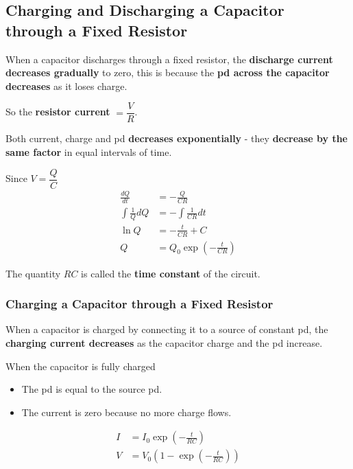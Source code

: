 \subsection{Charging and Discharging a Capacitor\\through a Fixed Resistor}

When a capacitor discharges through a fixed resistor, the \textbf{discharge current decreases gradually} to zero, this is because the \textbf{pd across the capacitor decreases} as it loses charge.

So the \textbf{resistor current} $=\dfrac{V}{R}$.

Both current, charge and pd \textbf{decreases exponentially} - they \textbf{decrease by the same factor} in equal intervals of time.

Since $V=\dfrac{Q}{C}$
\begin{align*}
    \frac{dQ}{dt}&=-\frac{Q}{CR}\\
    \int\frac{1}{Q}dQ&=-\int\frac{1}{CR}dt\\
    \ln Q&=-\frac{t}{CR}+C\\
    Q&=Q_0\exp\left(-\frac{t}{CR}\right)
\end{align*}

The quantity $RC$ is called the \textbf{time constant} of the circuit.

\subsubsection*{Charging a Capacitor through a Fixed Resistor}

When a capacitor is charged by connecting it to a source of constant pd, the \textbf{charging current decreases} as the capacitor charge and the pd increase.

When the capacitor is fully charged
\begin{itemize}
    \item The pd is equal to the source pd.
    \item The current is zero because no more charge flows.
\end{itemize}

\begin{align*}
    I&=I_0\exp\left(-\frac{t}{RC}\right)\\
    V&=V_0\left(1-\exp\left(-\frac{t}{RC}\right)\right)
\end{align*}
